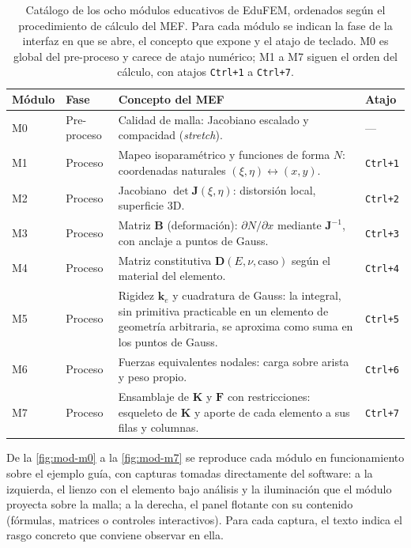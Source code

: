 \begin{table}[htbp]
\centering
\caption[Catálogo de los ocho módulos educativos de EduFEM.]{Catálogo de los ocho módulos educativos de EduFEM, ordenados según el procedimiento de cálculo del MEF. Para cada módulo se indican la fase de la interfaz en que se abre, el concepto que expone y el atajo de teclado. M0 es global del pre-proceso y carece de atajo numérico; M1 a M7 siguen el orden del cálculo, con atajos \texttt{Ctrl+1} a \texttt{Ctrl+7}.}
\label{tab:modulos-edu}
\begin{tabular}{l l p{6.2cm} l}
\toprule
\textbf{Módulo} & \textbf{Fase} & \textbf{Concepto del MEF} & \textbf{Atajo} \\
\midrule
M0 & Pre-proceso  & Calidad de malla: Jacobiano escalado y compacidad (\emph{stretch}). & --- \\
M1 & Proceso      & Mapeo isoparamétrico y funciones de forma $N$: coordenadas naturales $(\xi,\eta) \leftrightarrow (x,y)$. & \texttt{Ctrl+1} \\
M2 & Proceso      & Jacobiano $\det\bm{J}(\xi,\eta)$: distorsión local, superficie 3D. & \texttt{Ctrl+2} \\
M3 & Proceso      & Matriz $\bm{B}$ (deformación): $\partial N/\partial x$ mediante $\bm{J}^{-1}$, con anclaje a puntos de Gauss. & \texttt{Ctrl+3} \\
M4 & Proceso      & Matriz constitutiva $\bm{D}(E,\nu,\text{caso})$ según el material del elemento. & \texttt{Ctrl+4} \\
M5 & Proceso      & Rigidez $\bm{k}_e$ y cuadratura de Gauss: la integral, sin primitiva practicable en un elemento de geometría arbitraria, se aproxima como suma en los puntos de Gauss. & \texttt{Ctrl+5} \\
M6 & Proceso      & Fuerzas equivalentes nodales: carga sobre arista y peso propio. & \texttt{Ctrl+6} \\
M7 & Proceso      & Ensamblaje de $\bm{K}$ y $\bm{F}$ con restricciones: esqueleto de $\bm{K}$ y aporte de cada elemento a sus filas y columnas. & \texttt{Ctrl+7} \\
\bottomrule
\end{tabular}
\end{table}


De la \autoref{fig:mod-m0} a la \autoref{fig:mod-m7} se reproduce cada módulo en funcionamiento sobre el ejemplo guía, con capturas tomadas directamente del software: a la izquierda, el lienzo con el elemento bajo análisis y la iluminación que el módulo proyecta sobre la malla; a la derecha, el panel flotante con su contenido (fórmulas, matrices o controles interactivos). Para cada captura, el texto indica el rasgo concreto que conviene observar en ella.

